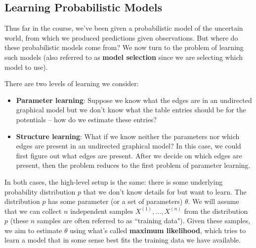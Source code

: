 
\subsection{Learning Probabilistic Models}

Thus far in the course, we've been given a probabilistic model of the uncertain world, from which we produced predictions given observations. But where do these probabilistic models come from? We now turn to the problem of learning such models (also referred to as \textbf{model selection} since we are selecting which model to use).

There are two levels of learning we consider:

\begin{itemize}
     \item \textbf{Parameter learning}: Suppose we know what the edges are in an undirected graphical model but we don't know what the table entries should be for the potentials – how do we estimate these entries?
     \item \textbf{Structure learning}: What if we know neither the parameters nor which edges are present in an undirected graphical model? In this case, we could first figure out what edges are present. After we decide on which edges are present, then the problem reduces to the first problem of parameter learning. 
\end{itemize}

In both cases, the high-level setup is the same: there is some underlying probability distribution $p$ that we don't know details for but want to learn. The distribution $p$ has some parameter (or a set of parameters) $\theta$. We will assume that we can collect $n$ independent samples $X^{(1)}, \dots, X^{(n)}$ from the distribution $p$ (these $n$ samples are often referred to as “training data"). Given these samples, we aim to estimate $\theta$ using what's called \textbf{maximum likelihood}, which tries to learn a model that in some sense best fits the training data we have available.

